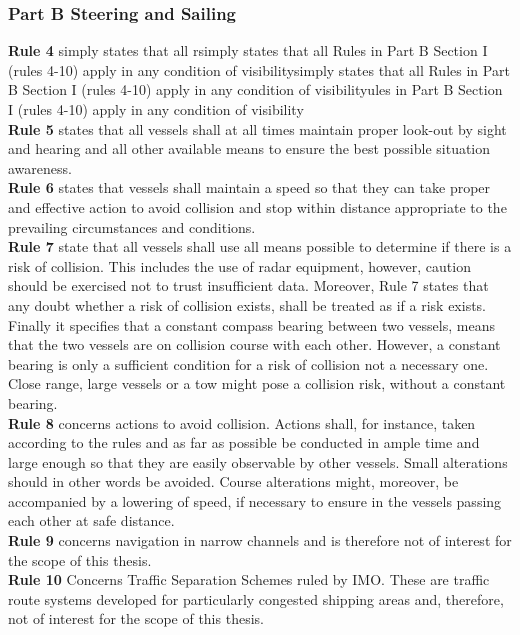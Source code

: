 \subsubsection{Part B Steering and Sailing}
\textbf{Rule 4} simply states that all rsimply states that all Rules in Part B Section I (rules 4-10) apply in any condition of visibilitysimply states that all Rules in Part B Section I (rules 4-10) apply in any condition of visibilityules in Part B Section I (rules 4-10) apply in any condition of visibility
\\
\textbf{Rule 5} states that all vessels shall at all times maintain proper look-out by sight and hearing and all other available means to ensure the best possible situation awareness.
\\
\textbf{Rule 6} states that vessels shall maintain a speed so that they can take proper and effective action to avoid collision and stop within distance appropriate to the prevailing circumstances and conditions.
\\
\textbf{Rule 7} state that all vessels shall use all means possible to determine if there is a risk of collision. 
This includes the use of radar equipment, however, caution should be exercised not to trust insufficient data. 
Moreover, Rule 7 states that any doubt whether a risk of collision exists, shall be treated as if a risk exists. 
Finally it specifies that a constant compass bearing between two vessels, means that the two vessels are on collision course with each other. 
However, a constant bearing is only a sufficient condition for a risk of collision not a necessary one. 
Close range, large vessels or a tow might pose a collision risk, without a constant bearing.
\\
\textbf{Rule 8} concerns actions to avoid collision. Actions shall, for instance, taken according to the rules and as far as possible be conducted in ample time and large enough so that they are easily observable by other vessels. Small alterations should in other words be avoided. Course alterations might, moreover, be accompanied by a lowering of speed, if necessary to ensure in the vessels passing each other at safe distance.
\\
\textbf{Rule 9} concerns navigation in narrow channels and is therefore not of interest for the scope of this thesis.
\\
\textbf{Rule 10} Concerns Traffic Separation Schemes ruled by IMO. These are traffic route systems developed for particularly congested shipping areas \cite{ships_routing_imo} and, therefore, not of interest for the scope of this thesis.
